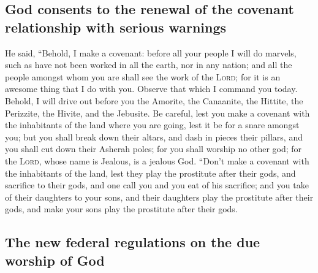 \hypertarget{god-consents-to-the-renewal-of-the-covenant-relationship-with-serious-warnings}{%
\subsection{God consents to the renewal of the covenant relationship
with serious
warnings}\label{god-consents-to-the-renewal-of-the-covenant-relationship-with-serious-warnings}}

 He said, ``Behold, I make a covenant: before all your
people I will do marvels, such as have not been worked in all the earth,
nor in any nation; and all the people amongst whom you are shall see the
work of the \textsc{Lord}; for it is an awesome thing that I do with
you.  Observe that which I command you today. Behold, I
will drive out before you the Amorite, the Canaanite, the Hittite, the
Perizzite, the Hivite, and the Jebusite.  Be careful,
lest you make a covenant with the inhabitants of the land where you are
going, lest it be for a snare amongst you;  but you shall
break down their altars, and dash in pieces their pillars, and you shall
cut down their Asherah poles;  for you shall worship no
other god; for the \textsc{Lord}, whose name is Jealous, is a jealous
God.  ``Don't make a covenant with the inhabitants of the
land, lest they play the prostitute after their gods, and sacrifice to
their gods, and one call you and you eat of his sacrifice;
 and you take of their daughters to your sons, and their
daughters play the prostitute after their gods, and make your sons play
the prostitute after their gods.

\hypertarget{the-new-federal-regulations-on-the-due-worship-of-god}{%
\subsection{The new federal regulations on the due worship of
God}\label{the-new-federal-regulations-on-the-due-worship-of-god}}

